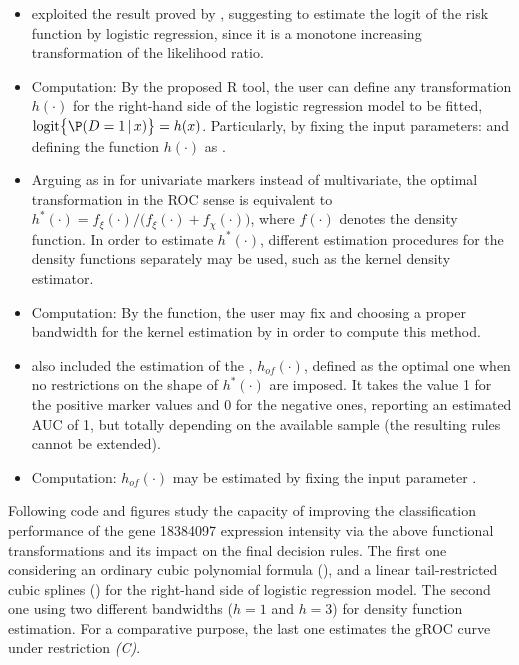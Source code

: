 \begin{itemize}
\item[1.-] \citet{Camblor2019a} exploited the result proved by \citet{McIntosh2002}, suggesting to estimate the logit of the risk function by logistic regression, since it is a monotone increasing transformation of the likelihood ratio.
\item[] Computation: By the proposed R tool, the user can define any transformation $h(\cdot)$ for the right-hand side of the logistic regression model to be fitted, $\mbox{logit} \big\{ \P(D = 1 \, | \, x) \big\} = h(x)$. Particularly, by fixing the input parameters:  and defining the function $h(\cdot)$ as .

\item[2.-] Arguing as in \citet{Camblor2021b} for univariate markers instead of multivariate, the optimal transformation in the ROC sense is equivalent to $h^*(\cdot)=f_\xi(\cdot)/\big(f_\xi(\cdot) + f_\chi(\cdot)\big)$, where $f(\cdot)$ denotes the density function.
In order to estimate $h^*(\cdot)$, different estimation procedures for the density functions separately may be used, such as the kernel density estimator.
\item[] Computation: By the  function, the user may fix  and choosing a proper bandwidth for the kernel estimation by  in order to compute this method.

\item[3.-] \citet{Camblor2019a} also included the estimation of the , $h_{of}(\cdot)$, defined as the optimal one when no restrictions on the shape of $h^*(\cdot)$ are imposed. It takes the value 1 for the positive marker values and 0 for the negative ones, reporting an estimated AUC of 1, but totally depending on the available sample (the resulting rules cannot be extended).
\item[] Computation: $h_{of}(\cdot)$ may be estimated by fixing the input parameter .
\end{itemize}



Following code and figures study the capacity of improving the classification performance of the gene 18384097 expression intensity via the above functional transformations and its impact on the final decision rules. The first one considering an ordinary cubic polynomial formula (), and a linear tail-restricted cubic splines () for the right-hand side of logistic regression model. The second one using two different bandwidths ($h=1$ and $h=3$) for density function estimation. For a comparative purpose, the last one estimates the gROC curve under restriction \textit{(C)}.


